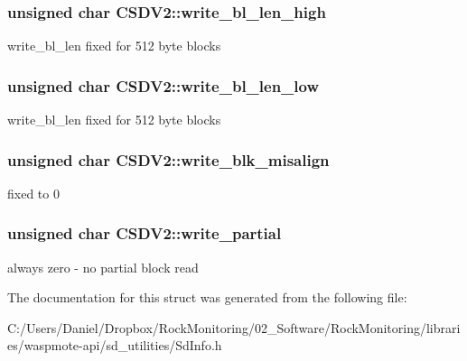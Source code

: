 \subsubsection[{\texorpdfstring{write\+\_\+bl\+\_\+len\+\_\+high}{write_bl_len_high}}]{\setlength{\rightskip}{0pt plus 5cm}unsigned char C\+S\+D\+V2\+::write\+\_\+bl\+\_\+len\+\_\+high}\hypertarget{struct_c_s_d_v2_af6592d240bf4b0c0d8b8a034d9fb1041}{}\label{struct_c_s_d_v2_af6592d240bf4b0c0d8b8a034d9fb1041}
write\+\_\+bl\+\_\+len fixed for 512 byte blocks 
\subsubsection[{\texorpdfstring{write\+\_\+bl\+\_\+len\+\_\+low}{write_bl_len_low}}]{\setlength{\rightskip}{0pt plus 5cm}unsigned char C\+S\+D\+V2\+::write\+\_\+bl\+\_\+len\+\_\+low}\hypertarget{struct_c_s_d_v2_a1d64afb6ea52bea58bdcc583ebd1d90f}{}\label{struct_c_s_d_v2_a1d64afb6ea52bea58bdcc583ebd1d90f}
write\+\_\+bl\+\_\+len fixed for 512 byte blocks 
\subsubsection[{\texorpdfstring{write\+\_\+blk\+\_\+misalign}{write_blk_misalign}}]{\setlength{\rightskip}{0pt plus 5cm}unsigned char C\+S\+D\+V2\+::write\+\_\+blk\+\_\+misalign}\hypertarget{struct_c_s_d_v2_ab80757f726c43476d311c5a0be8351e0}{}\label{struct_c_s_d_v2_ab80757f726c43476d311c5a0be8351e0}
fixed to 0 
\subsubsection[{\texorpdfstring{write\+\_\+partial}{write_partial}}]{\setlength{\rightskip}{0pt plus 5cm}unsigned char C\+S\+D\+V2\+::write\+\_\+partial}\hypertarget{struct_c_s_d_v2_a3aa87bccca13deac8c91464b8d0cd6b9}{}\label{struct_c_s_d_v2_a3aa87bccca13deac8c91464b8d0cd6b9}
always zero -\/ no partial block read 

The documentation for this struct was generated from the following file\+:\begin{DoxyCompactItemize}
\item 
C\+:/\+Users/\+Daniel/\+Dropbox/\+Rock\+Monitoring/02\+\_\+\+Software/\+Rock\+Monitoring/libraries/waspmote-\/api/sd\+\_\+utilities/Sd\+Info.\+h\end{DoxyCompactItemize}
